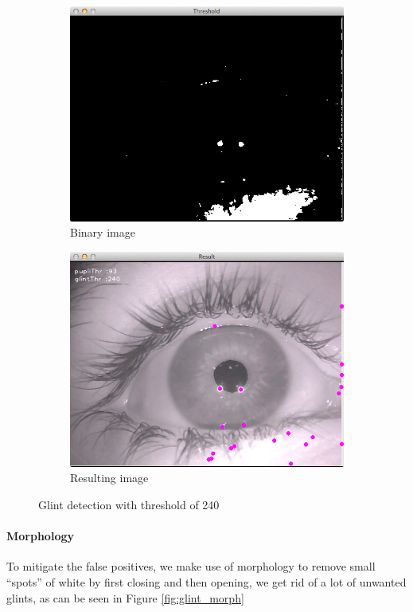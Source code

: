 \documentclass[a4paper,11pt]{article}
\begin{document}
\begin{figure}[H]
\centering
\begin{subfigure}{.48\textwidth}
  \centering
  \includegraphics[width=.8\linewidth]{glint_bin}
  \caption{Binary image}
  \label{fig:glint_binary}
\end{subfigure}
\begin{subfigure}{.48\textwidth}
  \centering
  \includegraphics[width=.8\linewidth]{glint_result}
  \caption{Resulting image}
  \label{fig:glint_result}
\end{subfigure}
\caption{Glint detection with threshold of 240}
\label{fig:glint}
\end{figure}

\paragraph{Morphology} To mitigate the false positives, we make use of morphology to remove small “spots” of white by first closing and then opening, we get rid of a lot of unwanted glints, as can be seen in Figure \ref{fig:glint_morph}
\end{document}
